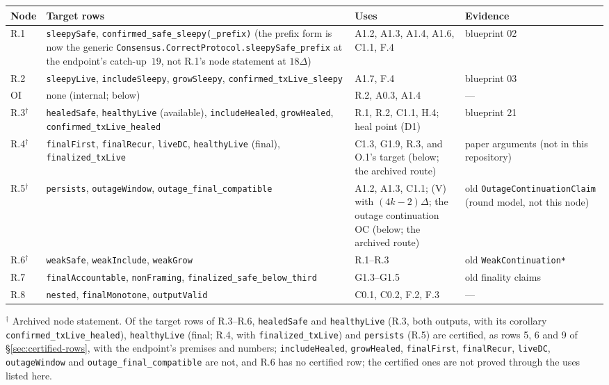 \documentclass{article}
\begin{document}
\begin{longtable}{@{}>{\raggedright\arraybackslash}p{1.1cm}>{\raggedright\arraybackslash}p{5.4cm}>{\raggedright\arraybackslash}p{3.4cm}>{\raggedright\arraybackslash}p{3.3cm}@{}}
\hline
Node & Target rows & Uses & Evidence\\
\hline
R.1 & \texttt{sleepySafe}, \texttt{confirmed\_safe\_sleepy(\_prefix)} (the
  prefix form is now the generic \texttt{Consensus.CorrectProtocol.\allowbreak sleepySafe\_prefix} at the
  endpoint's catch-up~$19$, not R.1's node statement at $18\Delta$) &
  A1.2, A1.3, A1.4, A1.6, C1.1, F.4 & blueprint 02\\
R.2 & \texttt{sleepyLive}, \texttt{includeSleepy}, \texttt{growSleepy},
  \texttt{confirmed\_txLive\_sleepy} & A1.7, F.4 & blueprint 03\\
OI & none (internal; below) & R.2, A0.3, A1.4 & ---\\
R.3$^\dagger$ & \texttt{healedSafe}, \texttt{healthyLive} (available),
  \texttt{includeHealed}, \texttt{growHealed},
  \texttt{confirmed\_txLive\_healed} & R.1, R.2, C1.1, H.4; heal point (D1) &
  blueprint 21\\
R.4$^\dagger$ & \texttt{finalFirst}, \texttt{finalRecur}, \texttt{liveDC},
  \texttt{healthyLive} (final), \texttt{finalized\_txLive} & C1.3, G1.9,
  R.3, and O.1's target (below; the archived route) & paper arguments (not in this repository)\\
R.5$^\dagger$ & \texttt{persists}, \texttt{outageWindow},
  \texttt{outage\_final\_compatible} & A1.2, A1.3, C1.1; (V) with
  $(4k-2)\Delta$; the outage continuation OC (below; the archived route) & old
  \texttt{OutageContinuationClaim} (round model, not this node)\\
R.6$^\dagger$ & \texttt{weakSafe}, \texttt{weakInclude},
  \texttt{weakGrow} & R.1--R.3 & old \texttt{WeakContinuation*}\\
R.7 & \texttt{finalAccountable}, \texttt{nonFraming},
  \texttt{finalized\_safe\_below\_third} & G1.3--G1.5 & old finality claims\\
R.8 & \texttt{nested}, \texttt{finalMonotone}, \texttt{outputValid} & C0.1,
  C0.2, F.2, F.3 & ---\\
\hline
\end{longtable}
\begin{sloppypar}
\noindent$^\dagger$ Archived node statement.  Of the target rows of R.3--R.6,
\texttt{healedSafe} and \texttt{healthyLive} (R.3, both outputs, with
its corollary \texttt{confirmed\_txLive\_healed}), \texttt{healthyLive}
(final; R.4, with \texttt{finalized\_txLive}) and \texttt{persists} (R.5)
are certified, as rows 5, 6 and 9 of \S\ref{sec:certified-rows}, with the
endpoint's premises and numbers; \texttt{includeHealed},
\texttt{growHealed}, \texttt{finalFirst}, \texttt{finalRecur},
\texttt{liveDC}, \texttt{outageWindow} and \texttt{outage\_final\_compatible}
are not, and R.6 has no certified row; the certified ones are not proved through the uses listed
here.
\end{sloppypar}
\end{document}

